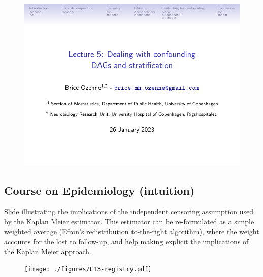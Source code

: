 \documentclass[12pt]{article}
\begin{document}
\begin{figure}[!h]
\centering
\includegraphics[trim={0 0 0 0}, page = 6, width=1\textwidth]{./figures/L5-confounding.pdf}
\label{fig:lmm-slide-wiw}
\end{figure}

\clearpage

\subsection{Course on Epidemiology (intuition)}
\label{appendix-intuition}
Slide illustrating the implications of the independent censoring
assumption used by the Kaplan Meier estimator. This estimator can be
re-formulated as a simple weighted average (Efron's redistribution to-the-right algorithm), where the weight accounts
for the lost to follow-up, and help making explicit the implications
of the Kaplan Meier approach.

\begin{figure}[!h]
\centering
\texttt{[image: ./figures/L13-registry.pdf]}
\label{fig:lmm-slide-wiw}
\end{figure}

\clearpage
\end{document}
